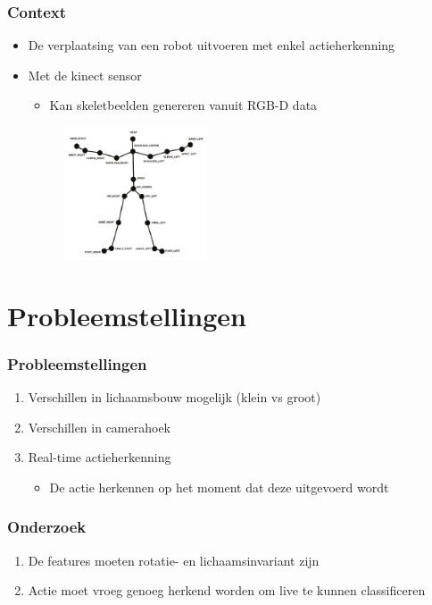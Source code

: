 \documentclass[]{beamer}
\begin{document}
	\begin{frame}\frametitle{Context}
		\begin{itemize}
			\item De verplaatsing van een robot uitvoeren met enkel actieherkenning
			\item<2-> Met de kinect sensor
			\begin{itemize}
				\item Kan skeletbeelden genereren vanuit RGB-D data
			\end{itemize}
			\begin{figure}
				\includegraphics[width=0.4\textwidth]{skeleton}
			\end{figure}	
		\end{itemize}
	\end{frame}

	\section{Probleemstellingen}
	\begin{frame}\frametitle{Probleemstellingen}
		\begin{enumerate}
			\item Verschillen in lichaamsbouw mogelijk (klein vs groot)
			\item Verschillen in camerahoek
			\item<2-> Real-time actieherkenning
			\begin{itemize}
				\item De actie herkennen op het moment dat deze uitgevoerd wordt
			\end{itemize} 
		\end{enumerate}
	\end{frame}

	\begin{frame}\frametitle{Onderzoek}
		\begin{enumerate}
			\item De features moeten rotatie- en lichaamsinvariant zijn
			\item Actie moet vroeg genoeg herkend worden om live te kunnen classificeren
		\end{enumerate}
	\end{frame}
\end{document}
